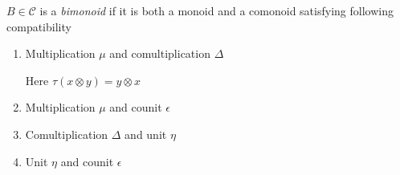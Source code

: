 \documentclass[main]{subfiles}
\begin{document}
\begin{definition}
$B\in\mathscr C$ is a \textit{bimonoid} if it is both a monoid and a comonoid satisfying following compatibility
\begin{enumerate}
\item Multiplication $\mu$ and comultiplication $\Delta$ \begin{center}
\end{center}
Here $\tau(x\otimes y)=y\otimes x$
\item Multiplication $\mu$ and counit $\epsilon$ \begin{center}
\end{center}
\item Comultiplication $\Delta$ and unit $\eta$ \begin{center}
\end{center}
\item Unit $\eta$ and counit $\epsilon$ \begin{center}
\end{center}
\end{enumerate}
\end{definition}
\end{document}

